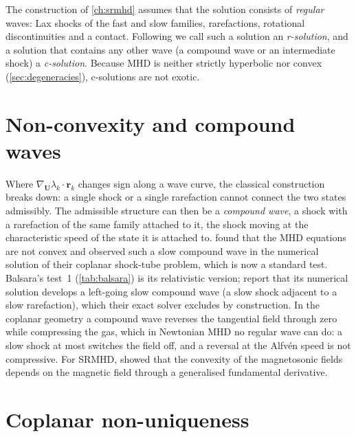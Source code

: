 \documentclass[11pt,a4paper,oneside,openany]{book}
\newcommand{\textcite}{\citet}
\theoremstyle{definition}
\theoremstyle{plain}
\theoremstyle{remark}
\newcommand{\UU}{\bm{U}}
\begin{document}
The construction of \cref{ch:srmhd} assumes that the solution consists of
\emph{regular} waves: Lax shocks of the fast and slow families, rarefactions, rotational
discontinuities and a contact. Following \textcite{Torrilhon2003jcp} we call such a
solution an \emph{r-solution}, and a solution that contains any other wave (a compound wave
or an intermediate shock) a \emph{c-solution}. Because MHD is neither strictly hyperbolic
nor convex (\cref{sec:degeneracies}), c-solutions are not exotic.

\section{Non-convexity and compound waves}

Where $\nabla_{\UU}\lambda_k\cdot\bm r_k$ changes sign along a wave curve, the classical
construction breaks down: a single shock or a single rarefaction cannot connect the two
states admissibly. The admissible structure can then be a \emph{compound wave}, a shock
with a rarefaction of the same family attached to it, the shock moving at the characteristic
speed of the state it is attached to. \textcite{BrioWu1988} found that the MHD equations are
not convex and observed such a slow compound wave in the numerical solution of their
coplanar shock-tube problem, which is now a standard test. Balsara's test~1
(\cref{tab:balsara}) is its relativistic version; \textcite{GiacomazzoRezzolla2006} report
that its numerical solution develops a left-going slow compound wave (a slow shock adjacent
to a slow rarefaction), which their exact solver excludes by construction. In the coplanar
geometry a compound wave reverses the tangential field through zero while compressing the
gas, which in Newtonian MHD no regular wave can do: a slow shock at most switches the field
off, and a reversal at the Alfvén speed is not compressive. For SRMHD, \textcite{Ibanez2015}
showed that the convexity of the magnetosonic fields depends on the magnetic field through a
generalised fundamental derivative.

\section{Coplanar non-uniqueness}
\end{document}
